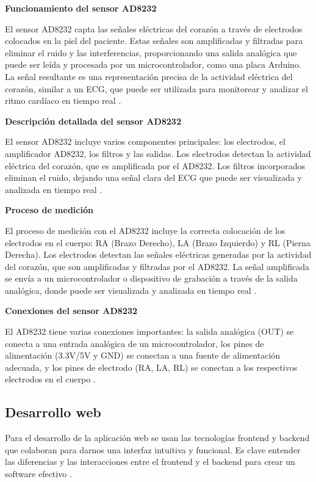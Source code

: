 \textbf{Funcionamiento del sensor AD8232}

El sensor AD8232 capta las señales eléctricas del corazón a través de electrodos colocados en la piel del paciente. Estas señales son amplificadas y filtradas para eliminar el ruido y las interferencias, proporcionando una salida analógica que puede ser leída y procesada por un microcontrolador, como una placa Arduino. La señal resultante es una representación precisa de la actividad eléctrica del corazón, similar a un ECG, que puede ser utilizada para monitorear y analizar el ritmo cardíaco en tiempo real \cite{Kumar2020_LowCostECG}.

\textbf{Descripción detallada del sensor AD8232}

El sensor AD8232 incluye varios componentes principales: los electrodos, el amplificador AD8232, los filtros y las salidas. Los electrodos detectan la actividad eléctrica del corazón, que es amplificada por el AD8232. Los filtros incorporados eliminan el ruido, dejando una señal clara del ECG que puede ser visualizada y analizada en tiempo real \cite{AD8232_teoria}.

\textbf{Proceso de medición}

El proceso de medición con el AD8232 incluye la correcta colocación de los electrodos en el cuerpo: RA (Brazo Derecho), LA (Brazo Izquierdo) y RL (Pierna Derecha). Los electrodos detectan las señales eléctricas generadas por la actividad del corazón, que son amplificadas y filtradas por el AD8232. La señal amplificada se envía a un microcontrolador o dispositivo de grabación a través de la salida analógica, donde puede ser visualizada y analizada en tiempo real \cite{SparkFun_AD8232}.

\textbf{Conexiones del sensor AD8232}

El AD8232 tiene varias conexiones importantes: la salida analógica (OUT) se conecta a una entrada analógica de un microcontrolador, los pines de alimentación (3.3V/5V y GND) se conectan a una fuente de alimentación adecuada, y los pines de electrodo (RA, LA, RL) se conectan a los respectivos electrodos en el cuerpo \cite{AD8232_teoria}.


\subsection{Desarrollo web}

Para el desarrollo de la aplicación web se usan las tecnologías frontend y backend que colaboran para darnos una interfaz intuitiva y funcional. Es clave entender las diferencias y las interacciones entre el frontend y el backend para crear un software efectivo \cite{PrimeIT}.

